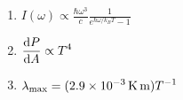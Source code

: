 

\vspace*{\fill}
\centering

\begin{enumerate}
    \item $\displaystyle I(\omega) \propto \frac{\hbar\omega^3}{c} \frac{1}{e^{\hbar\omega/k_{B}T}-1}$ 
    \item $\displaystyle \dv{P}{A} \propto T^{4}$
    \item $\displaystyle \lambda_{\rm max} = (\SI{2.9e-3}{\kelvin\m})T^{-1}$
\end{enumerate}

\centering
\vspace*{\fill}

